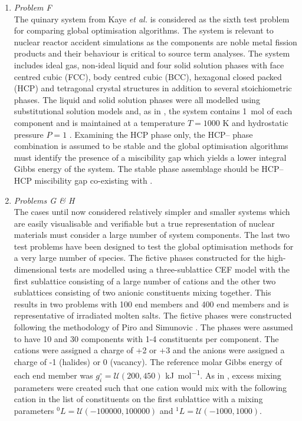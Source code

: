 \begin{enumerate}
	\item	\emph{Problem F}\\
		The quinary  system from Kaye \textit {et al.} \cite{Kaye07} is considered as the sixth test problem for comparing global optimisation algorithms. The system is relevant to nuclear reactor accident simulations as the components are noble metal fission products and their behaviour is critical to source term analyses. The system includes ideal gas, non-ideal liquid and four solid solution phases with face centred cubic (FCC), body centred cubic (BCC), hexagonal closed packed (HCP) and tetragonal crystal structures in addition to several stoichiometric phases. The liquid and solid solution phases were all modelled using substitutional solution models and, as in \cite{Piro16}, the system contains \SI{1}{\mole} of each component and is maintained at a temperature $T = 1000$ \si{\kelvin} and hydrostatic pressure $P=1$ \si{\atmosphere}. Examining the HCP phase only, the HCP-- phase combination is assumed to be stable and the global optimisation algorithms must identify the presence of a miscibility gap which yields a lower integral Gibbs energy of the system. The stable phase assemblage should be HCP--HCP miscibility gap co-existing with .
	
	\item	\emph{Problems G \& H}\\
		The cases until now considered relatively simpler and smaller systems which are easily visualisable and verifiable but a true representation of nuclear materials must consider a large number of system components. The last two test problems have been designed to test the global optimisation methods for a very large number of species. The fictive phases constructed for the high-dimensional tests are modelled using a three-sublattice CEF model with the first sublattice consisting of a large number of cations and the other two sublattices consisting of two anionic constituents mixing together. This results in two problems with 100 end members and 400 end members and is representative of irradiated molten salts. The fictive phases were constructed following the methodology of Piro and Simunovic \cite{Piro16}. The phases were assumed to have 10 and 30 components with 1-4 constituents per component. The cations were assigned a charge of +2 or +3 and the anions were assigned a charge of -1 (halides) or 0 (vacancy). The reference molar Gibbs energy of each end member was $g_i^\circ = \mathcal{U}(200, 450)$ \si{\kilo \joule \per \mole}. As in \cite{Piro16}, excess mixing parameters were created such that one cation would mix with the following cation in the list of constituents on the first sublattice with a mixing parameters ${^0}L = \mathcal{U}(-100000, 100000)$ and ${^1}L = \mathcal{U}(-1000, 1000)$.			
	\end{enumerate}

